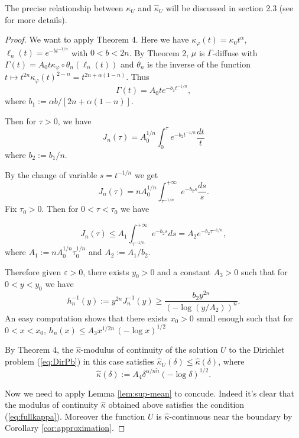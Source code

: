 \documentclass[12pt]{amsart}
\theoremstyle{definition}
\numberwithin{theorem}{section}
\numberwithin{equation}{section}
\begin{document}
{The precise relationship between $\kappa_U$ and $\widehat{\kappa}_U$ will be discussed in section 2.3 (see \cite{Ze20} for more details).  
\begin{proof}
We want to apply  Theorem 4.  Here we have $\kappa_\varphi (t) = \kappa_0 t^\alpha$, $\ell_n (t) =e^{- bt^{-1\slash n}}$ with $0 < b < 2 n$. By Theorem 2, $\mu$ is $\Gamma$-diffuse with $\Gamma (t) = A_0 t  \kappa_\varphi \circ \theta_n \left(\ell_n (t)\right)$ and $\theta_n$ is the inverse  of the function 
$t \longmapsto t^{2n} \kappa_\varphi (t)^{2 - n} = t^{2n + \alpha (1-n)}$.  Thus 
$$
\Gamma (t) = A_0  t  e^{-b_1 t^{-1\slash n}},
$$
where $b_1:= \alpha b \slash [2 n + \alpha (1-n)]$.
 
 Then for $\tau > 0$, we have
 $$
 J_n (\tau) = A_0^{1\slash n}  \int_0^\tau  e^{-b_2 t^{-1\slash n}} \frac{dt}{t}
 $$
 where $b_2 := b_1\slash n$. 
 
  By the change of variable $s = t^{-1\slash n}$  we get
 $$
  J_n (\tau) = n A_0^{1\slash n}  \int_{\tau^{-1\slash n}}^{+ \infty}  e^{-b_2 s} \frac{ds}{s}.
 $$
  Fix $\tau_0 > 0$. Then for $0< \tau < \tau_0$ we have  
  
  $$
  J_n (\tau) \leq A_1  \int_{\tau^{-1\slash n}}^{+ \infty}  e^{-b_2 s} {ds} = A_2  e^{-b_2 \tau^{-1\slash n}},
  $$
  where $A_1 := n A_0^{1\slash n} \tau_0^{1\slash n}$ and $A_2 := A_1 \slash b_2$.
  
 Therefore given $\varepsilon > 0$, there exists $y_0 > 0$ and a constant $A_3 > 0$ such that  for $0 < y < y_0$ we have
  $$
h^{-1}_n (y) :=  y^{2n}  J_n^{-1} (y) \geq \frac{b_2 y^{2 n}}{\left(- \log (y\slash A_2)\right)^n}.
  $$
An easy computation shows that there exists $x_0 > 0$ small enough such that for $0< x < x_0$,  $h_n (x)  \leq A_3 x^{1\slash 2 n} \, (- \log x)^{1 \slash 2}$

By Theorem 4, the $\widehat{\kappa}$-modulus of continuity of the solution $U$ to the Dirichlet problem (\ref{eq:DirPb}) in this case satisfies $\widehat{\kappa}_U (\delta) \leq \widehat{\kappa} (\delta)$, where
$$
\widehat{\kappa} (\delta) := A_4 \delta^{\alpha \slash n  \tilde n} (- \log \delta)^{1 \slash 2}.
$$

Now we need to apply Lemma \ref{lem:sup-mean} to concude. Indeed it's clear that the modulus of continuity $\widehat{\kappa}$ obtained above satisfies the condition  (\ref{eq:fullkappa}). Moreover the function $U$ is  $\widehat{\kappa}$-continuous near the boundary by Corollary \ref{cor:approximation}. \end{proof}


}
\end{document}
